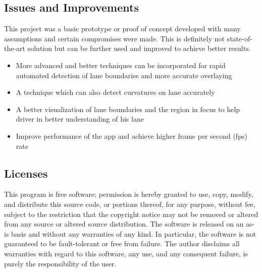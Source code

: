 \subsection{Issues and Improvements}

This project was a basic prototype or proof of concept developed with many assumptions and certain compromises were made. This is definitely not state-of-the-art solution but can be further used and improved to achieve better results. 

\begin{itemize}
        \item More advanced and better techniques can be incorporated for rapid automated detection of lane boundaries and more accurate overlaying
        \item A technique which can also detect curvatures on lane accurately
        \item A better visualization of lane boundaries and the region in focus to help driver in better understanding of his lane
        \item Improve performance of the app and achieve higher frame per second (fps) rate
\end{itemize}

\subsection{Licenses}

This program is free software; permission is hereby granted to use, copy, modify, and distribute this source code, or portions thereof, for any purpose, without fee, subject to the restriction that the copyright notice may not be removed or altered from any source or altered source distribution. The software is released on an as-is basis and without any warranties of any kind.    In particular, the software is not guaranteed to be fault-tolerant or free from failure. The author disclaims all warranties with regard to this software, any use, and any consequent failure, is purely the responsibility of the user.
